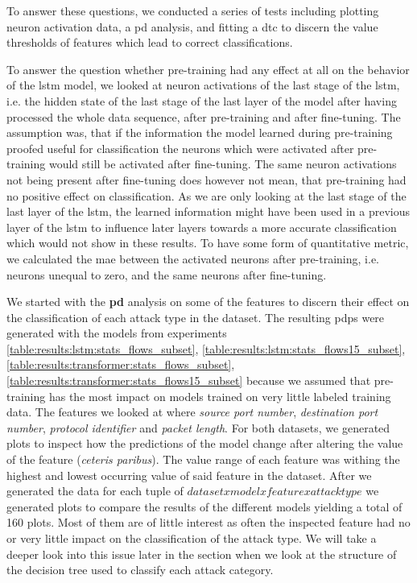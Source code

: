 To answer these questions, we conducted a series of tests including plotting neuron activation data, a \gls{pd} analysis, and fitting a \gls{dtc} to discern the value thresholds of features which lead to correct classifications. 

To answer the question whether pre-training had any effect at all on the behavior of the \gls{lstm} model, we looked at neuron activations of the last stage of the \gls{lstm}, i.e. the hidden state of the last stage of the last layer of the model after having processed the whole data sequence, after pre-training and after fine-tuning. The assumption was, that if the information the model learned during pre-training proofed useful for classification the neurons which were activated after pre-training would still be activated after fine-tuning. The same neuron activations not being present after fine-tuning does however not mean, that pre-training had no positive effect on classification. As we are only looking at the last stage of the last layer of the \gls{lstm}, the learned information might have been used in a previous layer of the \gls{lstm} to influence later layers towards a more accurate classification which would not show in these results. To have some form of quantitative metric, we calculated the \gls{mae} between the activated neurons after pre-training, i.e. neurons unequal to zero, and the same neurons after fine-tuning. 

We started with the \textbf{\gls{pd}} analysis on some of the features
to discern their effect on the classification of each attack type in the dataset. 
The resulting \glspl{pdp} were generated with the models from experiments \ref{table:results:lstm:stats_flows_subset},
\ref{table:results:lstm:stats_flows15_subset}, \ref{table:results:transformer:stats_flows_subset}, \ref{table:results:transformer:stats_flows15_subset} because we assumed that pre-training has the most impact on models trained on very little labeled training data. The features we looked at where \textit{source port number}, \textit{destination port number}, \textit{protocol identifier} and \textit{packet length}.
For both datasets, we generated plots to inspect how the predictions of the model change after altering the value of the feature (\textit{ceteris paribus}). The value range of each feature was withing the highest and lowest occurring value of said feature in the dataset. After we generated the data for each tuple of $dataset x model x feature x attack type$ we generated plots to compare the results of the different models yielding a total of 160 plots. Most of them are of little interest as often the inspected feature had no or very little impact on the classification of the attack type. We will take a deeper look into this issue later in the section when we look at the structure of the decision tree used to classify each attack category. 


